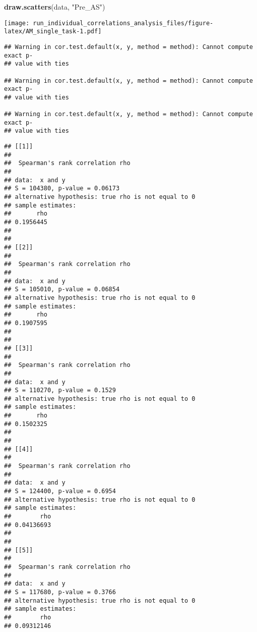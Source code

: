 \documentclass[]{article}
\newenvironment{Shaded}{\begin{snugshade}}{\end{snugshade}}
\newcommand{\KeywordTok}[1]{\textcolor[rgb]{0.13,0.29,0.53}{\textbf{#1}}}
\newcommand{\DataTypeTok}[1]{\textcolor[rgb]{0.13,0.29,0.53}{#1}}
\newcommand{\StringTok}[1]{\textcolor[rgb]{0.31,0.60,0.02}{#1}}
\newcommand{\OperatorTok}[1]{\textcolor[rgb]{0.81,0.36,0.00}{\textbf{#1}}}
\newcommand{\NormalTok}[1]{#1}
\begin{document}
\begin{Shaded}
\begin{Highlighting}[]
\KeywordTok{draw.scatters}\NormalTok{(data, }\StringTok{"Pre_AS"}\NormalTok{)}
\end{Highlighting}
\end{Shaded}

\texttt{[image: run\_individual\_correlations\_analysis\_files/figure-latex/AM\_single\_task-1.pdf]}

\begin{Shaded}
\end{Shaded}

\begin{verbatim}
## Warning in cor.test.default(x, y, method = method): Cannot compute exact p-
## value with ties

## Warning in cor.test.default(x, y, method = method): Cannot compute exact p-
## value with ties

## Warning in cor.test.default(x, y, method = method): Cannot compute exact p-
## value with ties
\end{verbatim}

\begin{verbatim}
## [[1]]
## 
##  Spearman's rank correlation rho
## 
## data:  x and y
## S = 104380, p-value = 0.06173
## alternative hypothesis: true rho is not equal to 0
## sample estimates:
##       rho 
## 0.1956445 
## 
## 
## [[2]]
## 
##  Spearman's rank correlation rho
## 
## data:  x and y
## S = 105010, p-value = 0.06854
## alternative hypothesis: true rho is not equal to 0
## sample estimates:
##       rho 
## 0.1907595 
## 
## 
## [[3]]
## 
##  Spearman's rank correlation rho
## 
## data:  x and y
## S = 110270, p-value = 0.1529
## alternative hypothesis: true rho is not equal to 0
## sample estimates:
##       rho 
## 0.1502325 
## 
## 
## [[4]]
## 
##  Spearman's rank correlation rho
## 
## data:  x and y
## S = 124400, p-value = 0.6954
## alternative hypothesis: true rho is not equal to 0
## sample estimates:
##        rho 
## 0.04136693 
## 
## 
## [[5]]
## 
##  Spearman's rank correlation rho
## 
## data:  x and y
## S = 117680, p-value = 0.3766
## alternative hypothesis: true rho is not equal to 0
## sample estimates:
##        rho 
## 0.09312146
\end{verbatim}
\end{document}
